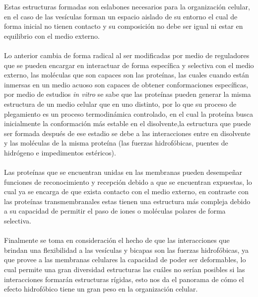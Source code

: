 \documentclass[10pt]{article}
\newcommand{\np}[1]{\paragraph{\normalfont{#1}}}
\newcommand{\et}[1]{\emph{#1}}
\begin{document}
    Estas estructuras formadas son eslabones necesarios para la organización celular, en el caso de las vesículas forman un espacio aislado de su entorno el cual de forma inicial no tienen contacto y su composición no debe ser igual ni estar en equilibrio con el medio externo. \np{}
    
    Lo anterior cambia de forma radical al ser modificadas por medio de reguladores que se pueden encargar en interactuar de forma específica y selectiva con el medio externo, las moléculas que son capaces son las proteínas, las cuales cuando están inmersas en un medio acuoso son capaces de obtener conformaciones específicas, por medio de estudios \et{in vitro} se sabe que las proteínas pueden generar la misma estructura de un medio celular que en uno distinto, por lo que su proceso de plegamiento es un proceso termodinámica controlado, en el cual la proteína busca inicialmente la conformación más estable en el disolvente,la estructura que puede ser formada después de ese estadio se debe a las interacciones entre en disolvente y las moléculas de la misma proteína (las fuerzas hidrofóbicas, puentes de hidrógeno e impedimentos estéricos). \np{}
    
    Las proteínas que se encuentran unidas en las membranas pueden desempeñar funciones de reconocimiento y recepción debido a que se encuentran expuestas, lo cual ya se encarga de que exista contacto con el medio externo, en contraste con las proteínas transmembranales estas tienen una estructura más compleja debido a su capacidad de permitir el paso de iones o moléculas polares de forma selectiva. \np{}
    
    Finalmente se toma en consideración el hecho de que las interacciones que brindan una flexibilidad a las vesículas y bicapas son las fuerzas hidrofóbicas, ya que provee a las membranas celulares la capacidad de poder ser deformables, lo cual permite una gran diversidad estructuras las cuáles no serían posibles si las interacciones formarán estructuras rígidas, esto nos da el panorama de cómo el efecto hidrofóbico tiene un gran peso en la organización celular.\np{}
    \np{}

    \paragraph{}

    
    

\end{document}
